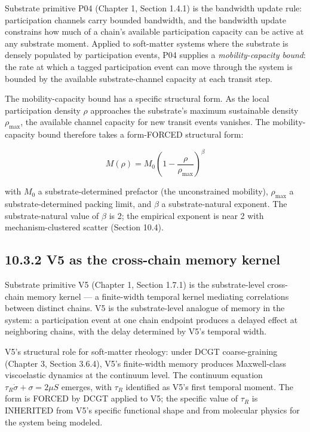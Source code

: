 \documentclass[11pt]{book}
\begin{document}
Substrate primitive P04 (Chapter 1, Section 1.4.1) is the bandwidth update rule: participation channels carry bounded bandwidth, and the bandwidth update constrains how much of a chain's available participation capacity can be active at any substrate moment. Applied to soft-matter systems where the substrate is densely populated by participation events, P04 supplies a \textit{mobility-capacity bound}: the rate at which a tagged participation event can move through the system is bounded by the available substrate-channel capacity at each transit step.

The mobility-capacity bound has a specific structural form. As the local participation density $\rho$ approaches the substrate's maximum sustainable density $\rho_\mathrm{max}$, the available channel capacity for new transit events vanishes. The mobility-capacity bound therefore takes a form-FORCED structural form:

\[
M(\rho) = M_0\left(1 - \frac{\rho}{\rho_\mathrm{max}}\right)^\beta
\]

with $M_0$ a substrate-determined prefactor (the unconstrained mobility), $\rho_\mathrm{max}$ a substrate-determined packing limit, and $\beta$ a substrate-natural exponent. The substrate-natural value of $\beta$ is 2; the empirical exponent is near 2 with mechanism-clustered scatter (Section 10.4).

\subsection{10.3.2 V5 as the cross-chain memory kernel}

Substrate primitive V5 (Chapter 1, Section 1.7.1) is the substrate-level cross-chain memory kernel — a finite-width temporal kernel mediating correlations between distinct chains. V5 is the substrate-level analogue of memory in the system: a participation event at one chain endpoint produces a delayed effect at neighboring chains, with the delay determined by V5's temporal width.

V5's structural role for soft-matter rheology: under DCGT coarse-graining (Chapter 3, Section 3.6.4), V5's finite-width memory produces Maxwell-class viscoelastic dynamics at the continuum level. The continuum equation $\tau_R\dot\sigma + \sigma = 2\mu S$ emerges, with $\tau_R$ identified as V5's first temporal moment. The form is FORCED by DCGT applied to V5; the specific value of $\tau_R$ is INHERITED from V5's specific functional shape and from molecular physics for the system being modeled.
\end{document}
